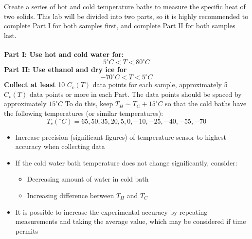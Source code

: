 \documentclass[12pt]{report}
\begin{document}
	Create a series of hot and cold temperature baths to measure the specific heat of two solids. 
This lab will be divided into two parts, so it is highly recommended to complete Part I for both samples first, and complete
 Part II for both samples last.\\
\\
\textbf{Part I: Use hot and cold water for:}
	\[ 5^{\circ}C < T < 80^{\circ}C\]
\textbf{Part II: Use ethanol and dry ice for}
	\[-70^{\circ}C<T<5^{\circ}C\]
\textbf{Collect at least} 10 $C_v(T)$ data points for each sample, approximately 5 $C_v(T)$ data points or more
in each Part. The data points should be spaced by approximately $15^{\circ}C$ To do this, keep $T_H \sim T_C+15^{\circ}C$
 so that the cold baths have the following temperatures (or similar temperatures):
\[T_c(^{\circ}C) = 65, 50, 35,20,5,0,-10,-25,-40,-55,-70\]
\begin{itemize}
	\item Increase precision (significant figures) of temperature sensor to highest accuracy when collecting data
	\item If the cold water bath temperature does not change significantly, consider:
	\begin{itemize}
		\item Decreasing amount of water in cold bath
		\item Increasing difference between $T_H$ and $T_C$
	\end{itemize}
	\item It is possible to increase the experimental accuracy by repeating measurements and taking the average value, 
which may be considered if time permits
\end{itemize}
\end{document}
